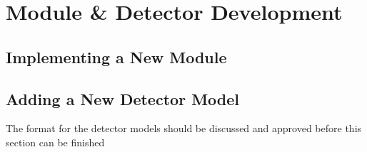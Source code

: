 \section{Module \& Detector Development}
\subsection{Implementing a New Module}
\label{sec:building_new_module}
\subsection{Adding a New Detector Model}
\label{sec:adding_detector_model}
\todo The format for the detector models should be discussed and approved before this section can be finished \todo
